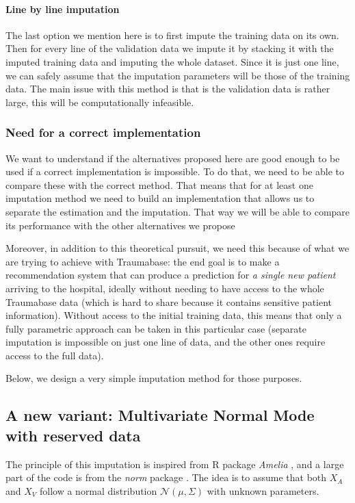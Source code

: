 \documentclass[12pt, a4paper]{memoir}
\begin{document}
\paragraph{Line by line imputation}
The last option we mention here is to first impute the training data on its own. Then for every line of the validation data we impute it by stacking it with the imputed training data and imputing the whole dataset. Since it is just one line, we can safely assume that the imputation parameters will be those of the training data. The main issue with this method is that is the validation data is rather large, this will be computationally infeasible.

			\subsubsection{Need for a correct implementation}
We want to understand if the alternatives proposed here are good enough to be used if a correct implementation is impossible. To do that, we need to be able to compare these with the correct method. That means that for at least one imputation method we need to build an implementation that allows us to separate the estimation and the imputation. That way we will be able to compare its performance with the other alternatives we propose

Moreover, in addition to this theoretical pursuit, we need this because of what we are trying to achieve with Traumabase: the end goal is to make a recommendation system that can produce a prediction for \emph{a single new patient} arriving to the hospital, ideally without needing to have access to the whole Traumabase data (which is hard to share because it contains sensitive patient information). Without access to the initial training data, this means that only a fully parametric approach can be taken in this particular case (separate imputation is impossible on just one line of data, and the other ones require access to the full data).

Below, we design a very simple imputation method for those purposes.

		\subsection{A new variant: Multivariate Normal Mode with reserved data}
The principle of this imputation is inspired from R package \emph{Amelia} \cite{ref_amelia}, and a large part of the code is from the \emph{norm} package \cite{pkg_norm}. The idea is to assume that both $X_A$ and $X_V$ follow a normal distribution $\mathcal{N}(\mu, \Sigma)$ with unknown parameters.
\end{document}
